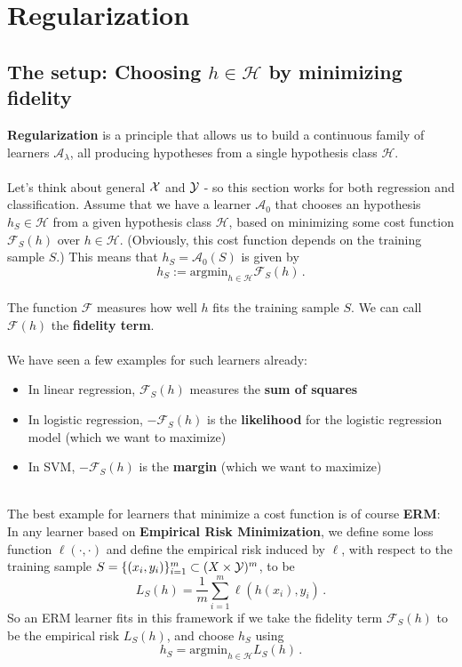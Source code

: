 \documentclass[11pt]{article}
\newcommand{\Ac}{\mathcal{A}}
\newcommand{\Fc}{\mathcal{F}}
\newcommand{\Hc}{\mathcal{H}}
\begin{document}
\section{Regularization}


\subsection{The setup: Choosing $h\in\Hc$ by minimizing fidelity}

{\bf Regularization} is a principle that allows us to build a continuous family
of learners $\Ac_\lambda$, all producing hypotheses from a single
 hypothesis class $\Hc$.
\\~\\
 Let's think about general $\mathcal{X}$ and $\mathcal{Y}$ - so this section works for both
 regression and classification.
Assume that we have a learner $\Ac_0$ that chooses an hypothesis
$h_S\in\Hc$ 
from a given hypothesis class $\Hc$, based
on minimizing some cost function $\Fc_S(h)$ over $h\in\Hc$.
(Obviously, this cost function depends on the training sample
$S$.) 
This means that $h_S=\Ac_0(S)$ is given by
\[
  h_S := \text{argmin}_{h\in\Hc} \Fc_S(h)\,.
\]
~\\
The function $\Fc$ measures how well $h$ fits the training sample $S$. We can
call $\Fc(h)$ the {\bf fidelity term}.
\\~\\
We have seen a few examples for such learners already:
\begin{itemize}
  \item In linear regression, $\Fc_S(h)$ measures the {\bf sum of squares}
  \item In logistic regression, $-\Fc_S(h)$ is the {\bf likelihood} for the logistic
    regression model (which we want to
    maximize)
  \item In SVM, $-\Fc_S(h)$ is the {\bf margin} (which we want to maximize)
\end{itemize}
~\\
The best example for learners that minimize a cost function is
of course {\bf ERM}: In any learner based on {\bf Empirical Risk Minimization}, we
define some loss function $\ell(\cdot,\cdot)$ and 
define the empirical risk induced by $\ell$, with respect to the training sample
$S=\{\left( x_i,y_i \right)\}_{i=1}^m\subset (X\times \mathcal{Y})^m$, to be
\[
  L_S(h) = \frac{1}{m} \sum_{i=1}^m \ell(h(x_i),y_i)\,.
\]
So an ERM learner fits in this framework if we take the fidelity term  
$\Fc_S(h)$ to be the empirical risk $L_S(h)$, and choose $h_S$ using
\[
  h_S = \text{argmin}_{h\in\Hc} L_S(h)\,.
\]
\end{document}
